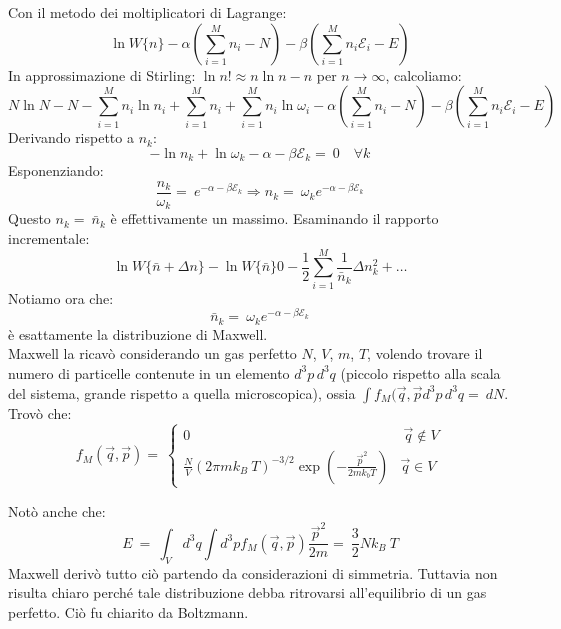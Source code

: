 \documentclass[../MeccanicaStatistica.tex]{subfiles}
\begin{document}
Con il metodo dei moltiplicatori di Lagrange:
\[
\ln W\{n\} -\alpha \left(\sum_{i=1}^M n_i - N \right) -\beta\left(\sum_{i=1}^M n_i \mathcal{E}_i - E\right)
\]
In approssimazione di Stirling: $\ln n! \approx n\ln n - n$ per $n\to \infty$, calcoliamo:
\[
N\ln N-N -\sum_{i=1}^M n_i \ln n_i + \sum_{i=1}^M n_i + \sum_{i=1}^M n_i \ln \omega_i -\alpha \left(\sum_{i=1}^M n_i - N\right ) -\beta\left(\sum_{i=1}^M n_i \mathcal{E}_i - E\right)
\]
Derivando rispetto a $n_k$:
\[
-\ln n_k +\ln \omega_k - \alpha - \beta\mathcal{E}_k =\ 0 \quad \forall k
\]
Esponenziando:
\[
\frac{n_k}{\omega_k} =\ e^{-\alpha -\beta\mathcal{E}_k} \Rightarrow n_k =\ \omega_k e^{-\alpha -\beta \mathcal{E}_k}
\]
Questo $n_k =\ \bar{n}_k$ è effettivamente un massimo. Esaminando il rapporto incrementale:
\[
\ln W\{\bar{n}+\Delta n\}-\ln W\{\bar{n}\} 0 -\frac{1}{2} \sum_{i=1}^M \frac{1}{\bar{n}_k} \Delta n_k^2 + \dots
\]
Notiamo ora che:
\begin{equation}
\bar{n}_k =\ \omega_k e^{-\alpha -\beta \mathcal{E}_k}
\label{eqn:Maxwell}
\end{equation}
è esattamente la distribuzione di Maxwell.\\
Maxwell la ricavò considerando un gas perfetto $N$, $V$, $m$, $T$, volendo trovare il numero di particelle contenute in un elemento $d^3 p\, d^3 q$ (piccolo rispetto alla scala del sistema, grande rispetto a quella microscopica), ossia $\int f_M(\vec{q}, \vec{p} d^3 p\, d^3 q =\ dN$. Trovò che:
\[
f_M(\vec{q}, \vec{p}) =\ \begin{cases}
0 &\ \vec{q}\notin V\\
\frac{N}{V} {(2\pi mk_B\ T)^{-3/2}} \exp{\left (-\frac{\vec{p}^2}{2mk_b T}\right )} & \vec{q} \in V
\end{cases}
\]

Notò anche che:
\[
E\ =\ \int_V d^3 q \int d^3 p f_M(\vec{q}, \vec{p}) \frac{\vec{p}^2}{2m} =\ \frac{3}{2} N k_B\ T
\]
Maxwell derivò tutto ciò partendo da considerazioni di simmetria. Tuttavia non risulta chiaro perché tale distribuzione debba ritrovarsi all'equilibrio di un gas perfetto. Ciò fu chiarito da Boltzmann.\\
\end{document}
